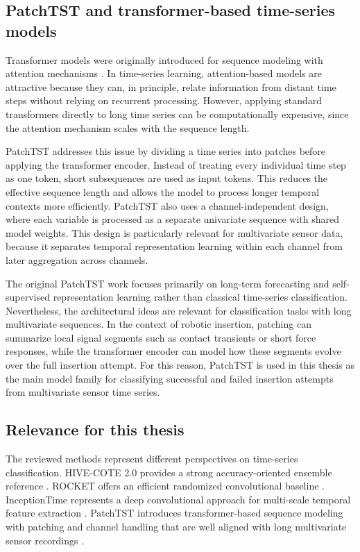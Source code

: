 \subsection{PatchTST \cite{nieTimeSeriesWorth2023b} and transformer-based time-series models}

Transformer models were originally introduced for sequence modeling with attention mechanisms \cite{vaswaniAttentionAllYou2017}. In time-series learning, attention-based models are attractive because they can, in principle, relate information from distant time steps without relying on recurrent processing. However, applying standard transformers directly to long time series can be computationally expensive, since the attention mechanism scales with the sequence length.

PatchTST addresses this issue by dividing a time series into patches before applying the transformer encoder. Instead of treating every individual time step as one token, short subsequences are used as input tokens. This reduces the effective sequence length and allows the model to process longer temporal contexts more efficiently. PatchTST also uses a channel-independent design, where each variable is processed as a separate univariate sequence with shared model weights. This design is particularly relevant for multivariate sensor data, because it separates temporal representation learning within each channel from later aggregation across channels.

The original PatchTST work focuses primarily on long-term forecasting and self-supervised representation learning rather than classical time-series classification. Nevertheless, the architectural ideas are relevant for classification tasks with long multivariate sequences. In the context of robotic insertion, patching can summarize local signal segments such as contact transients or short force responses, while the transformer encoder can model how these segments evolve over the full insertion attempt. For this reason, PatchTST is used in this thesis as the main model family for classifying successful and failed insertion attempts from multivariate sensor time series.

\subsection{Relevance for this thesis}

The reviewed methods represent different perspectives on time-series classification. HIVE-COTE 2.0 provides a strong accuracy-oriented ensemble reference \cite{middlehurstHIVECOTE20New2021}. ROCKET offers an efficient randomized convolutional baseline \cite{dempsterROCKETExceptionallyFast2020}. InceptionTime represents a deep convolutional approach for multi-scale temporal feature extraction \cite{ismailfawazInceptionTimeFindingAlexNet2020}. PatchTST introduces transformer-based sequence modeling with patching and channel handling that are well aligned with long multivariate sensor recordings \cite{nieTimeSeriesWorth2023b}.

